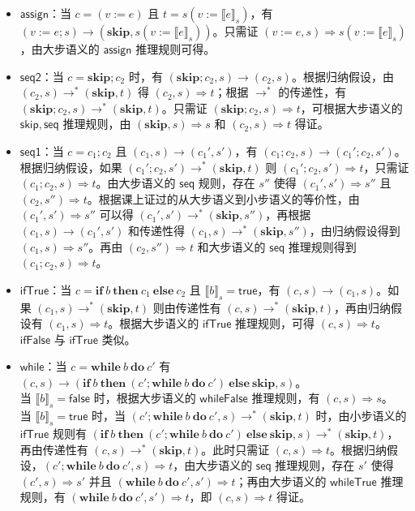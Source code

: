 \documentclass[UTF8]{ctexart}
\begin{document}
    \begin{itemize}
        \item $\mathsf{assign}$：当 $c=(v:=e)$ 且 $t=s(v:={\llbracket e \rrbracket}_s)$，有 $(v:=e; s) \to (\mathbf{skip}, s(v:={\llbracket e \rrbracket}_s))$。只需证 $(v:=e,s)\Rightarrow s(v:={\llbracket e \rrbracket}_s)$，由大步语义的 $\mathsf{assign}$ 推理规则可得。
        \item $\mathsf{seq2}$：当 $c=\mathbf{skip}; c_2$ 时，有 $(\mathbf{skip}; c_2, s) \to (c_2, s)$。根据归纳假设，由 $(c_2, s) \to^{\ast} (\mathbf{skip}, t)$ 得 $(c_2, s) \Rightarrow t$；根据 $\to^{\ast}$ 的传递性，有 $(\mathbf{skip}; c_2, s) \to^{\ast} (\mathbf{skip}, t)$。只需证 $(\mathbf{skip}; c_2, s) \Rightarrow t$，可根据大步语义的 $\mathsf{skip}, \mathsf{seq}$ 推理规则，由 $(\mathbf{skip}, s) \Rightarrow s$ 和 $(c_2, s) \Rightarrow t$ 得证。
        \item $\mathsf{seq1}$：当 $c=c_1; c_2$ 且 $(c_1, s) \to (c_1', s')$，有 $(c_1; c_2, s) \to (c_1'; c_2, s')$。根据归纳假设，如果 $(c_1'; c_2, s') \to^{\ast} (\mathbf{skip}, t)$ 则 $(c_1'; c_2, s') \Rightarrow t$，只需证 $(c_1; c_2, s) \Rightarrow t$。由大步语义的 $\mathsf{seq}$ 规则，存在 $s''$ 使得 $(c_1', s') \Rightarrow s''$ 且 $(c_2, s'') \Rightarrow t$。根据课上证过的从大步语义到小步语义的等价性，由 $(c_1', s') \Rightarrow s''$ 可以得 $(c_1', s') \to^{\ast} (\mathbf{skip}, s'')$，再根据 $(c_1, s) \to (c_1', s')$ 和传递性得 $(c_1, s) \to^{\ast} (\mathbf{skip}, s'')$，由归纳假设得到 $(c_1, s) \Rightarrow s''$。再由 $(c_2, s'') \Rightarrow t$ 和大步语义的 $\mathsf{seq}$ 推理规则得到 $(c_1; c_2, s) \Rightarrow t$。
        \item $\mathsf{ifTrue}$：当 $c=\mathbf{if}\ b\ \mathbf{then}\ c_1\ \mathbf{else}\ c_2$ 且 ${\llbracket b \rrbracket}_s = \mathsf{true}$，有 $(c, s) \to (c_1, s)$。如果 $(c_1, s) \to^{\ast} (\mathbf{skip}, t)$ 则由传递性有 $(c, s) \to^{\ast} (\mathbf{skip}, t)$，再由归纳假设有 $(c_1, s) \Rightarrow t$。根据大步语义的 $\mathsf{ifTrue}$ 推理规则，可得 $(c, s) \Rightarrow t$。$\mathsf{ifFalse}$ 与 $\mathsf{ifTrue}$ 类似。
        \item $\mathsf{while}$：当 $c=\mathbf{while}\ b\ \mathbf{do}\ c'$ 有 $(c, s) \to (\mathbf{if}\ b\ \mathbf{then}\ (c'; \mathbf{while}\ b\ \mathbf{do}\ c')\ \mathbf{else}\ \mathbf{skip}, s)$。\\
        当 ${\llbracket b \rrbracket}_s = \mathsf{false}$ 时，根据大步语义的 $\mathsf{whileFalse}$ 推理规则，有 $(c, s) \Rightarrow s$。\\
        当 ${\llbracket b \rrbracket}_s = \mathsf{true}$ 时，当 $(c'; \mathbf{while}\ b\ \mathbf{do}\ c', s) \to^{\ast} (\mathbf{skip}, t)$ 时，由小步语义的 $\mathsf{ifTrue}$ 规则有 $(\mathbf{if}\ b\ \mathbf{then}\ (c'; \mathbf{while}\ b\ \mathbf{do}\ c')\ \mathbf{else}\ \mathbf{skip}, s) \to^{\ast} (\mathbf{skip}, t)$，再由传递性有 $(c, s) \to^{\ast} (\mathbf{skip}, t)$。此时只需证 $(c, s) \Rightarrow t$。根据归纳假设，$(c'; \mathbf{while}\ b\ \mathbf{do}\ c', s) \Rightarrow t$，由大步语义的 $\mathsf{seq}$ 推理规则，存在 $s'$ 使得 $(c', s) \Rightarrow s'$ 并且 $(\mathbf{while}\ b\ \mathbf{do}\ c', s') \Rightarrow t$；再由大步语义的 $\mathsf{whileTrue}$ 推理规则，有 $(\mathbf{while}\ b\ \mathbf{do}\ c', s') \Rightarrow t$，即 $(c, s) \Rightarrow t$ 得证。

\end{itemize}
\end{document}
